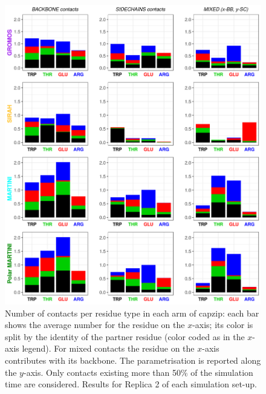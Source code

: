 \begin{figure}[p!]
\centering
\includegraphics[width=0.95\linewidth]{3results_capsule/pics/R2_new_rep1_allFF.png}
\caption[Replica 2: Contacts between molecules during simulations of the buckyball]{Number of contacts per residue type in each arm of capzip: each bar shows the average number for the residue on the $x$-axis; its color is split by the identity of the partner residue (color coded as in the $x$-axis legend). For mixed contacts the residue on the $x$-axis contributes with its backbone. The parametrisation is reported along the $y$-axis. Only contacts existing more than 50\% of the simulation time are considered. Results for Replica 2 of each simulation set-up.}
\label{fig:BTI_cont2}
\end{figure}

